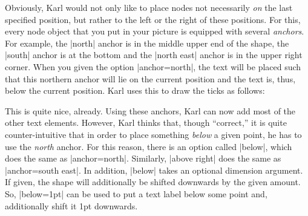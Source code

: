 \begin{codeexample}[]
\end{codeexample}

Obviously, Karl would not only like to place nodes not necessarily
\emph{on} the last specified position, but rather to the left or the
right of these positions. For this, every node object that you
put in your picture is equipped with several \emph{anchors}. For
example, the |north| anchor is in the middle upper end of the shape,
the |south| anchor is at the bottom and the |north east| anchor is in
the upper right corner. When you given the option |anchor=north|, the
text will be placed such that this northern anchor will lie on the
current position and the text is, thus, below the current
position. Karl uses this to draw the ticks as follows:

\begin{codeexample}[]
\end{codeexample}

This is quite nice, already. Using these anchors, Karl can now add
most of the other text elements. However, Karl thinks that, though
``correct,'' it is quite counter-intuitive that in order to place something
\emph{below} a given point, he has to use the \emph{north} anchor. For
this reason, there is an option called |below|, which does the
same as |anchor=north|. Similarly, |above right| does the same as
|anchor=south east|. In addition, |below| takes an optional
dimension argument. If given, the shape will additionally be shifted
downwards by the given amount. So, |below=1pt| can be used to put
a text label below some point and, additionally shift it  1pt
downwards. 

